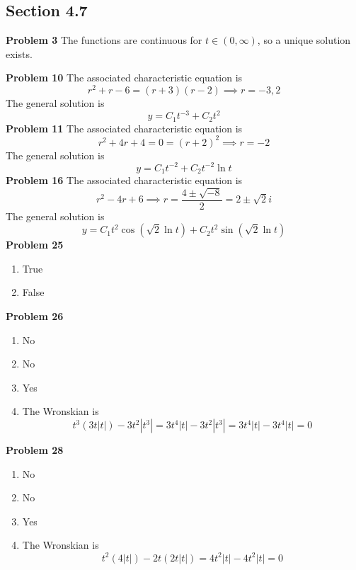 \subsection*{Section 4.7}
\textbf{Problem 3}
The functions are continuous for $t \in (0, \infty)$,
so a unique solution exists. 

\textbf{Problem 10}
The associated characteristic equation is 
\[
    r^2 + r - 6 = (r+3)(r-2)
    \implies r = -3, 2
\]
The general solution is 
\[
    y = C_1t^{-3} + C_2t^2
\]
\textbf{Problem 11}
The associated characteristic equation is 
\[
    r^2 + 4r + 4 = 0 = (r+2)^2
    \implies r = -2
\]
The general solution is 
\[
    y = C_1t^{-2} + C_2t^{-2}\ln t
\]
\textbf{Problem 16}
The associated characteristic equation is 
\[
    r^2 -4r + 6 \implies 
    r = \frac{4 \pm \sqrt{-8}}{2} = 2 \pm \sqrt{2}i
\]
The general solution is 
\[
    y = C_1t^2\cos(\sqrt{2}\ln t) + C_2t^2\sin(\sqrt{2}\ln t)
\]
\textbf{Problem 25}
\begin{enumerate}
    \item True
    \item False
\end{enumerate}
\textbf{Problem 26}
\begin{enumerate}
    \item No
    \item No
    \item Yes
    \item The Wronskian is 
    \[
        t^3(3t|t|) - 3t^2|t^3|
        =3t^4|t| - 3t^2|t^3|
        =3t^4|t| - 3t^4|t|
        = 0
    \]
\end{enumerate}
\textbf{Problem 28}
\begin{enumerate}
    \item No
    \item No
    \item Yes
    \item The Wronskian is 
    \[
        t^2(4|t|) - 2t(2t|t|)
        = 4t^2|t| - 4t^2|t|
        = 0
    \]
\end{enumerate}
